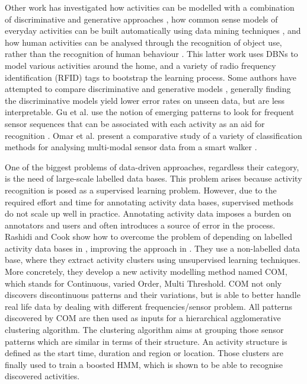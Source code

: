 Other work has investigated how activities can be modelled with a combination of discriminative and generative approaches \cite{Lester2005}, how common sense models of everyday activities can be built automatically using data mining techniques \cite{Pentney2008} \cite{Pentney2007}, and how human activities can be analysed through the recognition of object use, rather than the recognition of human behaviour \cite{Wu2007}. This latter work uses DBNs to model various activities around the home, and a variety of radio frequency identification (RFID) tags to bootstrap the learning process. Some authors have attempted to compare discriminative and generative models \cite{Bao2004} \cite{Ravi2005}, generally finding the discriminative models yield lower error rates on unseen data, but are less interpretable. Gu et al. use the notion of emerging patterns to look for frequent sensor sequences that can be associated with each activity as an aid for recognition \cite{Gu2009}. Omar et al. present a comparative study of a variety of classification methods for analysing multi-modal sensor data from a smart walker \cite{Omar2010}.

One of the biggest problems of data-driven approaches, regardless their category, is the need of large-scale labelled data bases. This problem arises because activity recognition is posed as a supervised learning problem. However, due to the required effort and time for annotating activity data bases, supervised methods do not scale up well in practice. Annotating activity data imposes a burden on annotators and users and often introduces a source of error in the process. Rashidi and Cook show how to overcome the problem of depending on labelled activity data bases in \cite{Rashidi2011}, improving the approach in \cite{Rashidi2013}. They use a non-labelled data base, where they extract activity clusters using unsupervised learning techniques. More concretely, they develop a new activity modelling method named COM, which stands for Continuous, varied Order, Multi Threshold. COM not only discovers discontinuous patterns and their variations, but is able to better handle real life data by dealing with different frequencies/sensor problem. All patterns discovered by COM are then used as inputs for a hierarchical agglomerative clustering algorithm. The clustering algorithm aims at grouping those sensor patterns which are similar in terms of their structure. An activity structure is defined as the start time, duration and region or location. Those clusters are finally used to train a boosted HMM, which is shown to be able to recognise discovered activities. 

